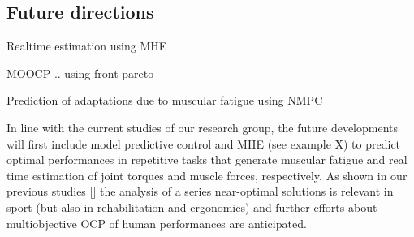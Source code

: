 \subsection{Future directions}
Realtime estimation using MHE

MOOCP .. using front pareto

Prediction of adaptations due to muscular fatigue using NMPC

In line with the current studies of our research group, the future developments will first include  model predictive control and MHE (see example X) to predict optimal performances in repetitive tasks that generate muscular fatigue and real time estimation of joint torques and muscle forces, respectively. 
As shown in our previous studies [\addref] the analysis of a series near-optimal solutions is relevant in sport (but also in rehabilitation and ergonomics) and further efforts about multiobjective OCP of human performances are anticipated. 
